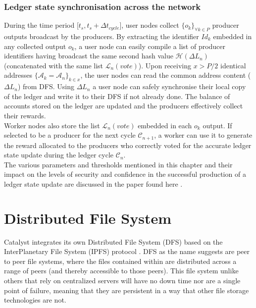 \documentclass{article}
\begin{document}
\subsubsection{Ledger state synchronisation across the network}

During the time period [$t_{s}, t_s + \Delta t_{cycle}$], user nodes collect $\{o_k\}_{\forall k \in P}$ producer outputs broadcast by the producers.
By extracting the identifier $Id_k$ embedded in any collected output $o_k$, a user node can easily compile a list of producer identifiers having broadcast the same second hash value $\mathcal{H}(\Delta L_n)$ (concatenated with the same list $\mathcal{L}_{n}(vote)$). Upon receiving $x > P/2$ identical addresses $\{\mathcal{A}_k = \mathcal{A}_n\}_{k \in x}$, the user nodes can read the common address content ($\Delta L_n$) from DFS. Using $\Delta L_n$ a user node can safely synchronise their local copy of the ledger and write it to their DFS if not already done. The balance of accounts stored on the ledger are updated and the producers effectively collect their rewards.\\


Worker nodes also store the list $\mathcal{L}_{n}(vote)$ embedded in each $o_k$ output. If selected to be a producer for the next cycle $\mathcal{C}_{n+1}$, a worker can use it to generate the reward allocated to the producers who correctly voted for the accurate ledger state update during the ledger cycle $\mathcal{C}_{n}$.\\


The various parameters and thresholds mentioned in this chapter and their impact on the levels of security and confidence in the successful production of a ledger state update are discussed in the paper found here \cite{catalystresearch2}.

\section{Distributed File System}

Catalyst integrates its own Distributed File System (DFS) \cite{DFS} based on the InterPlanetary File System (IPFS) protocol \cite{benet2014ipfs}. DFS as the name suggests are peer to peer file systems, where the files contained within are distributed across a range of peers (and thereby accessible to those peers). This file system unlike others that rely on centralized servers will have no down time nor are a single point of failure, meaning that they are persistent in a way that other file storage technologies are not. \\
\end{document}
